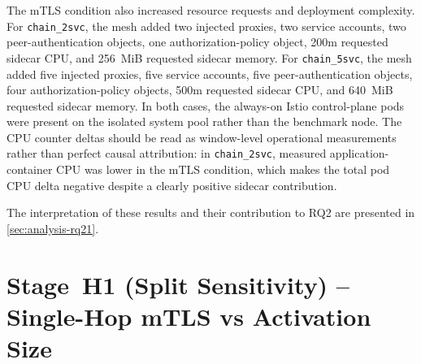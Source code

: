\begin{table}[ht]
\centering
\caption[Stage~H1 resource and operational overheads]{Stage~H1 resource and operational overheads. Sources: \texttt{merged/paired\_summary.md} in \texttt{rq2\_1\_paired\_20260515\_160012} (\texttt{chain\_2svc}) and \texttt{rq2\_1\_paired\_20260517\_114303} (\texttt{chain\_5svc}).}
\label{tab:rq21_resource_overhead}
\end{table}

The mTLS condition also increased resource requests and deployment complexity.
For \texttt{chain\_2svc}, the mesh added two injected proxies, two service
accounts, two peer-authentication objects, one authorization-policy object,
200m requested sidecar CPU, and 256~MiB requested sidecar memory. For
\texttt{chain\_5svc}, the mesh added five injected proxies, five service
accounts, five peer-authentication objects, four authorization-policy objects,
500m requested sidecar CPU, and 640~MiB requested sidecar memory. In both
cases, the always-on Istio control-plane pods were present on the isolated
system pool rather than the benchmark node. The CPU counter deltas should be
read as window-level operational measurements rather than perfect causal
attribution: in \texttt{chain\_2svc}, measured application-container CPU was
lower in the mTLS condition, which makes the total pod CPU delta negative
despite a clearly positive sidecar contribution.

The interpretation of these results and their contribution to RQ2 are presented in
\cref{sec:analysis-rq21}.

\section{Stage~H1 (Split Sensitivity) -- Single-Hop mTLS vs Activation Size}
\label{sec:rq21-splitsens}

